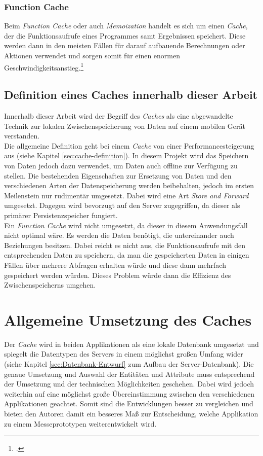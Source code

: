 \subsubsection*{Function Cache}
\label{sssec:cache-function-cache}
Beim \textit{Function Cache} oder auch \textit{Memoization} handelt es sich um einen \textit{Cache}, der die Funktionsaufrufe eines Programmes samt Ergebnissen speichert. Diese werden dann in den meisten Fällen für darauf aufbauende Berechnungen oder Aktionen verwendet und sorgen somit für einen enormen Geschwindigkeitsanstieg.\footcite{Cache-Memoization}
\subsection{Definition eines Caches innerhalb dieser Arbeit}
\label{ssec:cache-unsere-definition}
Innerhalb dieser Arbeit wird der Begriff des \textit{Caches} als eine abgewandelte Technik zur lokalen Zwischenspeicherung von Daten auf einem mobilen Gerät verstanden. \\
Die allgemeine Definition geht bei einem \textit{Cache} von einer Performancesteigerung aus (siehe Kapitel \ref{sec:cache-definition}). In diesem Projekt wird das Speichern von Daten jedoch dazu verwendet, um Daten auch offline zur Verfügung zu stellen. Die bestehenden Eigenschaften zur Ersetzung von Daten und den verschiedenen Arten der Datenspeicherung werden beibehalten, jedoch im ersten Meilenstein nur rudimentär umgesetzt. Dabei wird eine Art \textit{Store and Forward} umgesetzt. Dagegen wird bevorzugt auf den Server zugegriffen, da dieser als primärer Persistenzspeicher fungiert. \\
Ein \textit{Function Cache} wird nicht umgesetzt, da dieser in diesem Anwendungsfall nicht optimal wäre. Es werden die Daten benötigt, die untereinander auch Beziehungen besitzen. Dabei reicht es nicht aus, die Funktionsaufrufe mit den entsprechenden Daten zu speichern, da man die gespeicherten Daten in einigen Fällen über mehrere Abfragen erhalten würde und diese dann mehrfach gespeichert werden würden. Dieses Problem würde dann die Effizienz des Zwischenspeicherns umgehen.
\section{Allgemeine Umsetzung des Caches}
\label{sec:cache-umsetzung}
Der \textit{Cache} wird in beiden Applikationen als eine lokale Datenbank umgesetzt und spiegelt die Datentypen des Servers in einem möglichst großen Umfang wider (siehe Kapitel \ref{sec:Datenbank-Entwurf} zum Aufbau der Server-Datenbank). Die genaue Umsetzung und Auswahl der Entitäten und Attribute muss entsprechend der Umsetzung und der technischen Möglichkeiten geschehen. Dabei wird jedoch weiterhin auf eine möglichst große Übereinstimmung zwischen den verschiedenen Applikationen geachtet. Somit sind die Entwicklungen besser zu vergleichen und bieten den Autoren damit ein besseres Maß zur Entscheidung, welche Applikation zu einem Messeprototypen weiterentwickelt wird.
